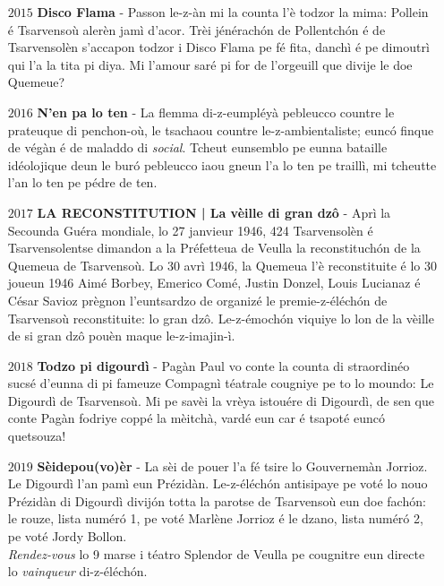 \begin{itemize}
\item[$2015$] \textbf{Disco Flama} - Passon le-z-àn mi la counta l'è todzor la mima: Pollein é Tsarvensoù alerèn jamì d'acor. Trèi jénérach\'on de Pollentch\'on é de Tsarvensolèn s'accapon todzor i Disco Flama pe fé fita, danchì é pe dimoutrì qui l'a la tita pi diya. Mi l'amour saré pi for de l'orgeuill que divije le doe Quemeue? \newline

\item[$2016$] \textbf{N'en pa lo ten} - La flemma di-z-eumpléyà pebleucco countre le prateuque di penchon-où, le tsachaou countre le-z-am\-bien\-ta\-li\-ste; eunc\'o finque de végàn é de maladdo di \textit{social}. Tcheut eunsemblo pe eunna bataille idéolojique deun le bur\'o pebleucco iaou gneun l'a lo ten pe traillì, mi tcheutte l'an lo ten pe pédre de ten.\newline

\item[$2017$] \textbf{LA RECONSTITUTION | La vèille di gran dz\^{o}} - Aprì la Secounda Guéra mondiale, lo 27 janvieur 1946, 424 Tsarvensolèn é Tsarvensolentse dimandon a la Préfetteua de Veulla la reconstituch\'on de la Quemeua de Tsarvensoù. Lo 30 avrì 1946, la Quemeua l'è reconstituite é lo 30 joueun 1946 Aimé Borbey, Emerico Comé, Justin Donzel, Louis Lucianaz é César Savioz prègnon l'euntsardzo de organizé le premie-z-éléch\'on de Tsarvensoù reconstituite: lo gran dzô. Le-z-é\-mo\-ch\'on viquiye lo lon de la vèille de si gran dzô pouèn maque le-z-imajin-ì.\newline

\item[$2018$] \textbf{Todzo pi digourdì} - Pagàn Paul vo conte la counta di straordinéo sucsé d'eunna di pi fameuze Compagnì téatrale cougniye pe to lo moundo: Le Digourdì de Tsarvensoù. Mi pe savèi la vrèya istouére di Digourdì, de sen que conte Pagàn fodriye coppé la mèitchà, vardé eun car é tsapoté eunc\'o quetsouza!\newline

\item[$2019$] \textbf{Sèidepou(vo)èr} - La sèi de pouer l'a fé tsire lo Gouvernemàn Jorrioz. Le Digourdì l'an pamì eun Prézidàn. Le-z-éléch\'on antisipaye pe voté lo nouo Prézidàn di Digourdì divij\'on totta la parotse de Tsarvensoù eun doe fach\'on: le rouze, lista numér\'o 1, pe voté Marlène Jorrioz é le dzano, lista numér\'o 2, pe voté Jordy Bollon. \\\textit{Rendez-vous} lo 9 marse i téatro Splendor de Veulla pe cougnitre eun directe lo \textit{vainqueur} di-z-éléch\'on.

\end{itemize}
